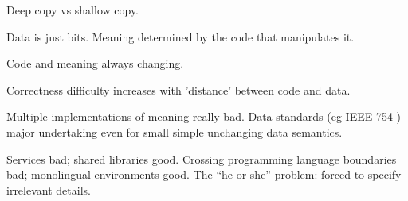 Deep copy vs shallow copy.

Data is just bits. 
Meaning determined by the code that manipulates it. 

Code and meaning always changing.

Correctness difficulty increases
with 'distance' between code and data. 

Multiple implementations of meaning really bad.
Data standards (eg IEEE 754 \cite{Higham2002ASNA, IEEE:1985:AIS,
P754:2008:ISF, Muller-et-al-2010}) major undertaking even for
small simple unchanging data semantics.

Services bad; shared libraries good.
Crossing programming language boundaries bad; 
monolingual environments \cite{Heering:1985:TMP:3318.3321} good.
The ``he or she'' problem: forced to specify irrelevant details.
